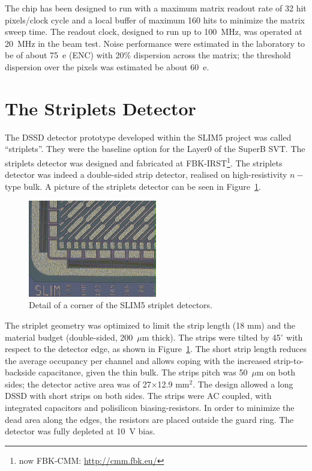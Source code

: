 The chip has been designed to run with a maximum matrix readout rate of 32 hit pixels/clock cycle and 
a local buffer of maximum 160 hits to minimize the matrix sweep time.
The readout clock, designed to run up to 100~MHz, was operated at 20~MHz in the beam test.
Noise performance were estimated in the laboratory to be of about 75~e (ENC) with 20\% dispersion 
across the matrix; the threshold dispersion over the pixels was estimated be about 60~e.

\section{The Striplets Detector}
\label{sec:Striplets}

The DSSD detector prototype  developed within the SLIM5 project was called ``striplets''. They 
were the baseline option for the Layer0 of the SuperB SVT.
The striplets detector was designed and fabricated at FBK-IRST\footnote{now FBK-CMM: \url{http://cmm.fbk.eu/}}.
The striplets detector was indeed a double-sided strip detector, realised on high-resistivity 
$n-$type bulk. A picture of the striplets detector can be seen in Figure~\ref{fig:striplets}.

\begin{figure}[!htpb]
\centering
\includegraphics[width=0.5\textwidth]{striplets.jpg}
\caption{\label{fig:striplets} Detail of a corner of the SLIM5 striplet detectors.}
\end{figure}

The striplet geometry was optimized to limit the strip length (18 mm) and the material budget 
(double-sided, 200~$\mu$m thick). The strips were tilted by 45$^{\circ}$ with respect to the 
detector edge, as shown in Figure~\ref{fig:striplets}. The short strip length reduces the average 
occupancy per channel and allows coping with the increased strip-to-backside capacitance, given 
the thin bulk. The strips pitch was 50~$\mu$m on both sides; the detector active area was 
of 27$\times$12.9 mm$^2$. The design allowed a long DSSD with short strips on both sides.
The strips were AC coupled, with integrated capacitors and polisilicon biasing-resistors. 
In order to minimize the dead area along the edges, the resistors are placed outside the guard ring. 
The detector was fully depleted at 10~V bias.

